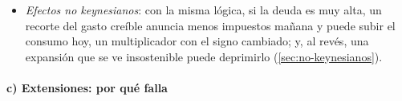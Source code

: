 \documentclass[11pt]{article}
\begin{document}
\begin{itemize}
\begin{itemize}
  \item lo que sí mueve la cuenta corriente es el \emph{gasto}: un aumento transitorio de $G_t$ (una guerra, una catástrofe) se reparte en el tiempo con deuda frente al exterior y abre un déficit corriente, tanto si se paga con impuestos como con deuda;
  \item los déficits gemelos aparecen cuando falla la equivalencia: con hogares que viven al día o con vidas finitas, la rebaja sube el consumo, el ahorro nacional baja y la cuenta corriente empeora, como en los Estados Unidos de los 80. Los datos están entre las 2~hipótesis (\ref{sec:evidencia-ricardiana}).
  \end{itemize}
\item \emph{Efectos no keynesianos}: con la misma lógica, si la deuda es muy alta, un recorte del gasto creíble anuncia menos impuestos mañana y puede subir el consumo hoy, un multiplicador con el signo cambiado; y, al revés, una expansión que se ve insostenible puede deprimirlo (\ref{sec:no-keynesianos}).
\end{itemize}

\paragraph{c) Extensiones: por qué falla}
\end{document}

